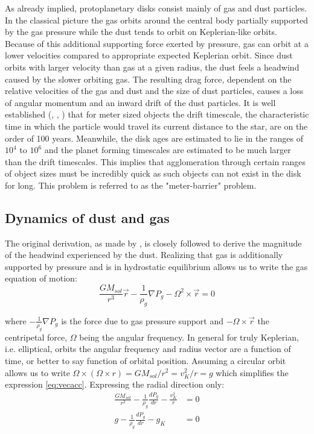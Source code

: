 \documentclass[12pt]{article}
\begin{document}
As already implied, protoplanetary disks consist mainly of gas and dust particles. In the classical picture the gas orbits around the central body partially supported by the gas pressure while the dust tends to orbit on Keplerian-like orbits. Because of this additional supporting force exerted by pressure, gas can orbit at a lower velocities compared to appropriate expected Keplerian orbit. Since dust orbits with larger velocity than gas at a given radius, the dust feels a headwind caused by the slower orbiting gas. The resulting drag force, dependent on the relative velocities of the gas and dust and the size of dust particles, causes a loss of angular momentum and an inward drift of the dust particles. It is well established (\cite{Weidenschilling77}, \cite{Armitage07}, \cite{ChiangYoudin10}) that for meter sized objects the drift timescale, the characteristic time in which the particle would travel its current distance to the star, are on the order of 100 years. Meanwhile, the disk ages are estimated to lie in the ranges of $10^4$ to $10^6$ \citep{Weidenschilling77} and the planet forming timescales are estimated to be much larger than the drift timescales. This implies that agglomeration through certain ranges of object sizes must be incredibly quick as such objects can not exist in the disk for long. This problem is referred to as the "meter-barrier" problem. 

\subsection{Dynamics of dust and gas}

The original derivation, as made by \citet{Weidenschilling77}, is closely followed to derive the magnitude of the headwind experienced by the dust. Realizing that gas is additionally supported by pressure and is in hydrostatic equilibrium allows us to write the gas equation of motion:
\begin{equation}
    \label{eq:vecacc}
    \frac{GM_{sol}}{r^3}\vec{r} - \frac{1}{\rho_g}\nabla P_g - \Omega^2\times\vec{r} = 0
\end{equation}

\noindent where $-\frac{1}{\rho_g}\nabla P_g$ is the force due to gas pressure support and  $-\Omega\times\vec{r}$ the centripetal force, $\Omega$ being the angular frequency. In general for truly Keplerian, i.e. elliptical, orbits the angular frequency and radius vector are a function of time, or better to say function of orbital position. Assuming a circular orbit allows us to write $\Omega\times(\Omega\times r) = GM_{sol}/r^2 = v_K^2/r = g$ which simplifies the expression \ref{eq:vecacc}. Expressing the radial direction only:
\begin{align}
    \label{eq:radialacc}
    \frac{GM_{sol}}{r^2} - \frac{1}{\rho_g}\frac{dP_g}{dr} - \frac{v_K^2}{r} &= 0 \\
    g - \frac{1}{\rho_g}\frac{dP_g}{dr} - g_K &= 0
\end{align}
\end{document}
